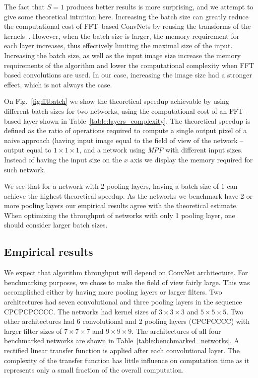 \documentclass[conference]{./IEEEtran/IEEEtran}
\begin{document}
  The fact that $S=1$ produces better results is more surprising, and
  we attempt to give some theoretical intuition here.  Increasing the
  batch size can greatly reduce the computational cost of FFT--based
  ConvNets by reusing the transforms of the
  kernels~\cite{mathieu-iclr-14,vasilache2014fast}.  However, when the
  batch size is larger, the memory requirement for each layer
  increases, thus effectively limiting the maximal size of the input.
  Increasing the batch size, as well as the input image size increase
  the memory requirements of the algorithm and lower the computational
  complexity when FFT based convolutions are used.  In our case,
  increasing the image size had a stronger effect, which is not always
  the case.

  On Fig.~\ref{fig:fftbatch} we show the theoretical speedup
  achievable by using different batch sizes for two networks, using
  the computational cost of an FFT--based layer shown in
  Table~\ref{table:layers_complexity}.  The theoretical speedup is
  defined as the ratio of operations required to compute a single
  output pixel of a naive approach (having input image equal to the
  field of view of the network -- output equal to $1 \times 1 \times
  1$, and a network using \emph{MPF} with different input sizes.
  Instead of having the input size on the $x$ axis we display the
  memory required for such network.

  We see that for a network with 2 pooling layers, having a batch size
  of $1$ can achieve the highest theoretical speedup.  As the networks
  we benchmark have 2 or more pooling layers our empirical results
  agree with the theoretical estimate.  When optimizing the throughput
  of networks with only 1 pooling layer, one should consider larger
  batch sizes.

\subsection{Empirical results}
  We expect that algorithm throughput will depend on ConvNet
  architecture.  For benchmarking purposes, we chose to make the field
  of view fairly large.  This was accomplished either by having more
  pooling layers or larger filters. Two architectures had seven
  convolutional and three pooling layers in the sequence CPCPCPCCCC.
  The networks had kernel sizes of $3\times 3 \times 3$ and $5\times
  5\times 5$.  Two other architectures had 6 convolutional and 2
  pooling layers (CPCPCCCC) with larger filter sizes of $7 \times
  7 \times 7$ and $9 \times 9 \times 9$.  The architectures of all
  four benchmarked networks are shown in
  Table~\ref{table:benchmarked_networks}.  A rectified linear transfer
  function is applied after each convolutional layer.  The complexity
  of the transfer function has little influence on computation
  time as it represents only a small fraction of the overall
  computation.
\end{document}
